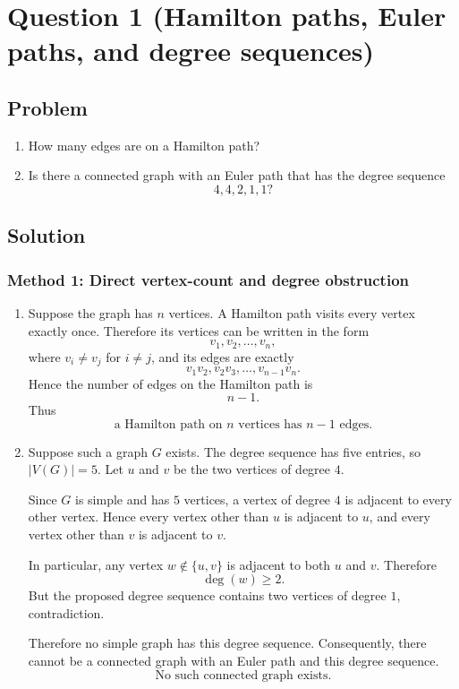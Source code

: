 \documentclass[12pt]{article}
\begin{document}
\section{Question 1 (Hamilton paths, Euler paths, and degree sequences)}

\subsection{Problem}
\begin{enumerate}[label=(\alph*)]
  \item How many edges are on a Hamilton path?
  \item Is there a connected graph with an Euler path that has the degree sequence
  \[
  4,4,2,1,1?
  \]
\end{enumerate}

\subsection{Solution}

\subsubsection{Method 1: Direct vertex-count and degree obstruction}
\begin{enumerate}[label=(\alph*)]
  \item Suppose the graph has $n$ vertices. A Hamilton path visits every vertex exactly once. Therefore its vertices can be written in the form
  \[
  v_1,v_2,\dots,v_n,
  \]
  where $v_i\neq v_j$ for $i\neq j$, and its edges are exactly
  \[
  v_1v_2,
  v_2v_3,
  \dots,
  v_{n-1}v_n.
  \]
  Hence the number of edges on the Hamilton path is
  \[
  n-1.
  \]
  Thus
  \[
  \boxed{\text{a Hamilton path on }n\text{ vertices has }n-1\text{ edges}.}
  \]

  \item Suppose such a graph $G$ exists. The degree sequence has five entries, so $|V(G)|=5$. Let $u$ and $v$ be the two vertices of degree $4$.

  Since $G$ is simple and has $5$ vertices, a vertex of degree $4$ is adjacent to every other vertex. Hence every vertex other than $u$ is adjacent to $u$, and every vertex other than $v$ is adjacent to $v$.

  In particular, any vertex $w\notin\{u,v\}$ is adjacent to both $u$ and $v$. Therefore
  \[
  \deg(w)\ge 2.
  \]
  But the proposed degree sequence contains two vertices of degree $1$, contradiction.

  Therefore no simple graph has this degree sequence. Consequently, there cannot be a connected graph with an Euler path and this degree sequence.
  \[
  \boxed{\text{No such connected graph exists.}}
  \]
\end{enumerate}
\end{document}
